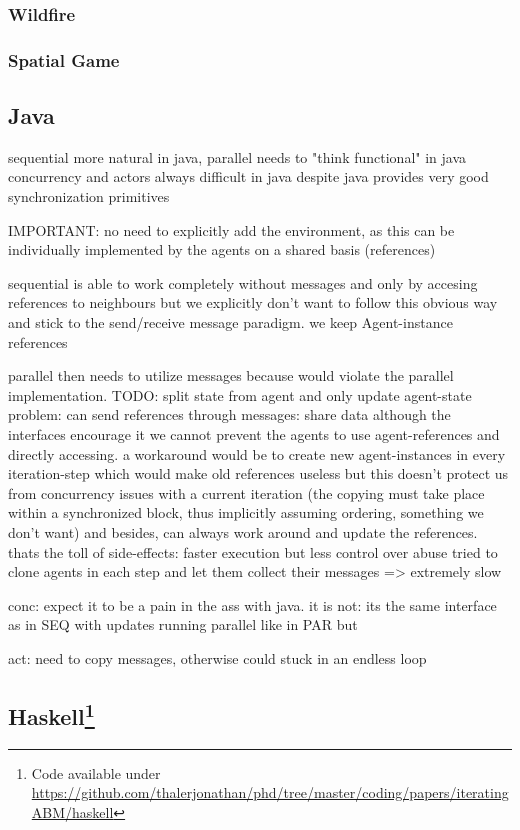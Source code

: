 \subsubsection{Wildfire}
\subsubsection{Spatial Game}


\subsection{Java}
sequential more natural in java,
parallel needs to "think functional" in java
concurrency and actors always difficult in java despite java provides very good synchronization primitives

IMPORTANT: no need to explicitly add the environment, as this can be individually implemented by the agents on a shared basis (references)

sequential is able to work completely without messages and only by accesing references to neighbours but we explicitly don't want to follow this obvious way and stick to the send/receive message paradigm. we keep Agent-instance references

parallel then needs to utilize messages because would violate the parallel implementation. TODO: split state from agent and only update agent-state
problem: can send references through messages: share data
although the interfaces encourage it we cannot prevent the agents to use agent-references and directly accessing. a workaround would be to create new agent-instances in every iteration-step which would make old references useless but this doesn't protect us from concurrency issues with a current iteration (the copying must take place within a synchronized block, thus implicitly assuming ordering, something we don't want) and besides, can always work around and update the references.
thats the toll of side-effects: faster execution but less control over abuse
tried to clone agents in each step and let them collect their messages => extremely slow

conc: expect it to be a pain in the ass with java. it is not: its the same interface as in SEQ with updates running parallel like in PAR but 

act: need to copy messages, otherwise could stuck in an endless loop

\subsection[Haskell]{Haskell\footnote{Code available under\\ \url{https://github.com/thalerjonathan/phd/tree/master/coding/papers/iteratingABM/haskell}}}

